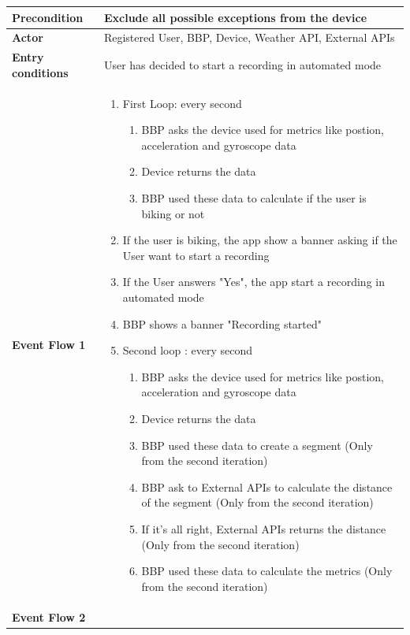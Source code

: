 \begin{longtable}{|p{3.5cm}|p{11.5cm}|}
    \textbf{Precondition} & Exclude all possible exceptions from the device\\ \hline
    \textbf{Actor} & Registered User, BBP, Device, Weather API, External APIs \\ \hline
    \textbf{Entry conditions} & User has decided to start a recording in automated mode \\ \hline
    \textbf{Event Flow 1} & \vspace{0pt}
    \begin{enumerate}[nosep, leftmargin=*] 
    \item First Loop: every second \begin{enumerate} 
    \item BBP asks the device used for metrics like postion, acceleration and gyroscope data
    \item Device returns the data
    \item BBP used these data to calculate if the user is biking or not
    \end{enumerate}
    \item If the user is biking, the app show a banner asking if the User want to start a recording
    \item If the User answers "Yes", the app start a recording in automated mode
    \item BBP shows a banner "Recording started"
    \item Second loop : every second \begin{enumerate} 
        \item BBP asks the device used for metrics like postion, acceleration and gyroscope data
        \item Device returns the data
        \item BBP used these data to create a segment (Only from the second iteration)
        \item BBP ask to External APIs to calculate the distance of the segment (Only from the second iteration)
        \item If it's all right, External APIs returns the distance (Only from the second iteration)
        \item BBP used these data to calculate the metrics (Only from the second iteration)
    \end{enumerate} 
\end{enumerate}\\ \hline
    \textbf{Event Flow 2} & \vspace{0pt}
    \begin{enumerate}[nosep, leftmargin=*] 

\end{enumerate}
\end{longtable}
